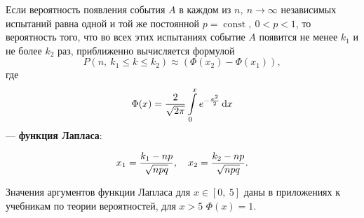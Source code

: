 \documentclass[a4paper]{article}
\DeclareMathOperator{\const}{const}
\newcommand{\sleq}{\leqslant}
\newcommand{\sqrtt}[1]{\sqrt{\vphantom{qb} #1}}
\newcommand{\key}[1]{{\color{Medium}\bfseries #1}}
\begin{document}
                        Если вероятность появления события $A$ в каждом из $n, \: n \to \infty$ независимых испытаний равна одной и той же постоянной $p = \const , \: 0 < p < 1$, то вероятность того, что во всех этих испытаниях событие $A$ появится не менее $k_1$ и не более $k_2$ раз, приближенно вычисляется формулой
                        \begin{equation*}
                            P(n, \: k_1 \sleq k \sleq k_2) \approx (\Phi (x_2) - \Phi (x_1)) ,
                        \end{equation*}
                        где
                        \begin{equation*}
                            \Phi (x) = \frac{2}{\sqrtt{2 \pi}}
                                \int\limits_{0}^{x} e^{-\frac{x^\text{\tiny 2}}{2}} \dif x
                        \end{equation*}
                        --- \key{функция Лапласа}:

                        \vspace{2.0ex}


                        \begin{equation*}
                            x_1 = \frac{k_1 - n p}{\sqrtt{n p q}} , \quad
                                x_2 = \frac{k_2 - n p}{\sqrtt{n p q}} .
                        \end{equation*}
                        
                        Значения аргументов функции Лапласа для $x \in [0, \: 5]$ даны в приложениях к учебникам по теории вероятностей, для $x > 5$ \:$\Phi (x) = 1$.

        \newpage
        
\end{document}
